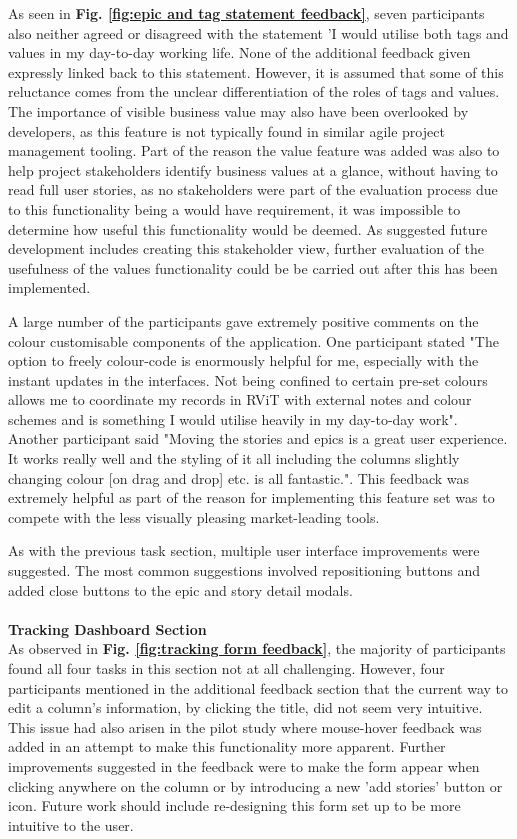\documentclass[l4proj.tex]{subfiles}
\begin{document}
As seen in \textbf{Fig. \ref{fig:epic and tag statement feedback}}, seven participants also neither agreed or disagreed with the statement 'I would utilise both tags and values in my day-to-day working life. None of the additional feedback given expressly linked back to this statement. However, it is assumed that some of this reluctance comes from the unclear differentiation of the roles of tags and values. The importance of visible business value may also have been overlooked by developers, as this feature is not typically found in similar agile project management tooling. Part of the reason the value feature was added was also to help project stakeholders identify business values at a glance, without having to read full user stories, as no stakeholders were part of the evaluation process due to this functionality being a would have requirement, it was impossible to determine how useful this functionality would be deemed. As suggested future development includes creating this stakeholder view, further evaluation of the usefulness of the values functionality could be be carried out after this has been implemented.

A large number of the participants gave extremely positive comments on the colour customisable components of the application. One participant stated "The option to freely colour-code is enormously helpful for me, especially with the instant updates in the interfaces. Not being confined to certain pre-set colours allows me to coordinate my records in RViT with external notes and colour schemes and is something I would utilise heavily in my day-to-day work". Another participant said "Moving the stories and epics is a great user experience. It works really well and the styling of it all including the columns slightly changing colour [on drag and drop] etc. is all fantastic.". This feedback was extremely helpful as part of the reason for implementing this feature set was to compete with the less visually pleasing market-leading tools.

As with the previous task section, multiple user interface improvements were suggested. The most common suggestions involved repositioning buttons and added close buttons to the epic and story detail modals. \\
\\
\textbf{Tracking Dashboard Section}\\
As observed in \textbf{Fig. \ref{fig:tracking form feedback}}, the majority of participants found all four tasks in this section not at all challenging. However, four participants mentioned in the additional feedback section that the current way to edit a column's information, by clicking the title, did not seem very intuitive. This issue had also arisen in the pilot study where mouse-hover feedback was added in an attempt to make this functionality more apparent. Further improvements suggested in the feedback were to make the form appear when clicking anywhere on the column or by introducing a new 'add stories' button or icon. Future work should include re-designing this form set up to be more intuitive to the user.
\end{document}
